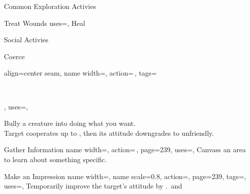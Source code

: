 \begin{PageFront}
\begin{Tables}{\frontTableHeight}
\begin{Table}{Common Exploration Activies}
\begin{entry}{Treat Wounds}
{                uses=\Medicine,
            }
                Heal  \hfill {} \hfill{}\\\hfill
                \Ts\DC[15] \quad
                \E\DC[20] \quad
                \M\DC[30]  \quad
                \Le\DC[40] \hfill {}
            \end{entry}
        \end{Table}
        \TableSpace
        \begin{Table}{Social Activies}
            \begin{entry}{Coerce}{%
                align=center seam,
                name width=\activityLength,%
                action=\,,
                tags=\parbox{0.5\linewidth}{\raggedleft{}\,\Concentrate\\\Auditory\Linguistic},
                uses=\InitimidationWill,
            }
                Bully a creature into doing what you want.\\
                Target cooperates up to , then its attitude downgrades to unfriendly. \hfill
                \\
                \hfill {}
            \end{entry}
            \begin{entry}{Gather Information}{%
                name width=\activityLength,%
                action=\,,
                page=239,
                uses={\Diplomacy[tags={S}]},
            }
                Canvass an area to learn about something specific.\hfill{}
            \end{entry}
            \begin{entry}{Make an Impression}{%
                name width=\activityLength,%
                name scale=0.8,
                action=,
                page=239,
                tags=\kern-0.5pt\Mental\Concentrate,
                uses=\DiplomacyWill,
            }
                Temporarily improve the target's attitude by . \quad\Auditory\,and
                \Linguistic

\end{entry}
\end{Table}
\end{Tables}
\end{PageFront}
